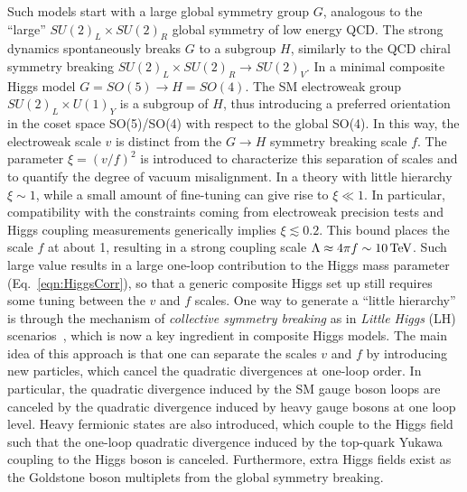 Such models start with a large global symmetry group $G$, analogous to the ``large'' $SU(2)_L \times SU(2)_R$ global symmetry of low energy QCD.
The strong dynamics spontaneously breaks $G$ to a subgroup $H$, similarly to the QCD chiral symmetry breaking $SU(2)_L \times SU(2)_R \to SU(2)_V$.
In a minimal composite Higgs model $G = SO(5) \to H = SO(4)$.
The SM electroweak group $SU(2)_L \times U(1)_Y$ is a subgroup of $H$, thus introducing a preferred orientation in the coset space SO(5)/SO(4) with respect to the global SO(4).
In this way, the electroweak scale $v$ is distinct from the $G \to H$ symmetry breaking scale $f$. The parameter $\xi = (v/f)^2$ is introduced to characterize this separation of scales and to quantify the degree of vacuum misalignment.
In a theory with little hierarchy $\xi \sim 1$, while a small amount of fine-tuning can give rise to $\xi \ll 1$. In particular, compatibility with the constraints coming from electroweak precision tests and Higgs coupling measurements generically implies $\xi \lesssim 0.2$. This bound places the scale $f$ at about 1\TeV, resulting in a strong coupling scale $\Lambda \approx 4\pi f \sim 10\,\text{Te\hspace{-.08em}V}$.
Such large value results in a large one-loop contribution to the Higgs mass parameter (Eq.~\ref{eqn:HiggsCorr}), so that a generic composite Higgs set up still requires some tuning between the $v$ and $f$ scales.
One way to generate a ``little hierarchy'' is through the mechanism of \textit{collective symmetry breaking} as in \textit{Little Higgs} (LH) scenarios~\cite{Han:2003wu,Perelstein:2005ka,Schmaltz:2005ky,Arkani:2002LH,Burdman:2002ns}, which is now a key ingredient in composite Higgs models.
The main idea of this approach is that one can separate the scales $v$ and $f$ by introducing new particles, which cancel the quadratic divergences at one-loop order. 
In particular, the quadratic divergence induced by the SM gauge boson loops are canceled by the quadratic divergence induced by heavy gauge bosons at one loop level.
Heavy fermionic states are also introduced, which couple to the Higgs field such that the one-loop quadratic divergence induced by the top-quark Yukawa coupling to the Higgs boson is canceled.
Furthermore, extra Higgs fields exist as the Goldstone boson multiplets from the global symmetry breaking.

